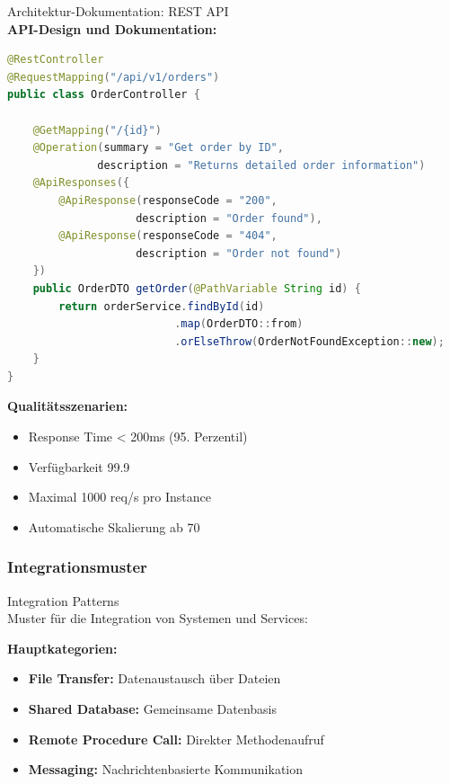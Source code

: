 \begin{example2}{Architektur-Dokumentation: REST API}\\
\textbf{API-Design und Dokumentation:}

\begin{lstlisting}[language=Java, style=basesmol]
@RestController
@RequestMapping("/api/v1/orders")
public class OrderController {
    
    @GetMapping("/{id}")
    @Operation(summary = "Get order by ID",
              description = "Returns detailed order information")
    @ApiResponses({
        @ApiResponse(responseCode = "200", 
                    description = "Order found"),
        @ApiResponse(responseCode = "404", 
                    description = "Order not found")
    })
    public OrderDTO getOrder(@PathVariable String id) {
        return orderService.findById(id)
                          .map(OrderDTO::from)
                          .orElseThrow(OrderNotFoundException::new);
    }
}
\end{lstlisting}

\textbf{Qualitätsszenarien:}
\begin{itemize}
    \item Response Time < 200ms (95. Perzentil)
    \item Verfügbarkeit 99.9%
    \item Maximal 1000 req/s pro Instance
    \item Automatische Skalierung ab 70%
\end{itemize}
\end{example2}

\subsubsection{Integrationsmuster}

\begin{concept}{Integration Patterns}\\
Muster für die Integration von Systemen und Services:

\textbf{Hauptkategorien:}
\begin{itemize}
    \item \textbf{File Transfer:} Datenaustausch über Dateien
    \item \textbf{Shared Database:} Gemeinsame Datenbasis
    \item \textbf{Remote Procedure Call:} Direkter Methodenaufruf
    \item \textbf{Messaging:} Nachrichtenbasierte Kommunikation
\end{itemize}
\end{concept}

